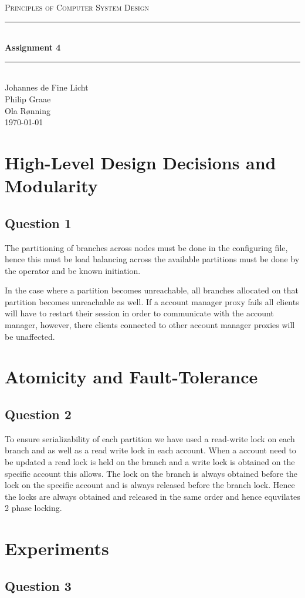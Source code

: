 \documentclass[12pt]{article}
\newcommand{\HRule}{\rule{\linewidth}{0.5mm}}
\begin{document}
\begin{center}
\textsc{\LARGE Principles of Computer System Design}\\[0.3cm] %
\HRule \\[0.4cm]
{ \huge \bfseries Assignment 4}
\HRule \\[0.4cm]
\large
Johannes de Fine Licht
\\Philip Graae
\\Ola Rønning
\\\today
\end{center}

\section*{High-Level Design Decisions and Modularity}

\subsection*{Question 1}
The partitioning of branches across nodes must be done in the configuring file, hence this must be load balancing across the available partitions must be done by the operator and be known initiation.

In the case where a partition becomes unreachable, all branches allocated on that partition becomes unreachable as well. If a account manager proxy fails all clients will have to restart their session in order to communicate with the account manager, however, there clients connected to other account manager proxies will be unaffected.
\section*{Atomicity and Fault-Tolerance}

\subsection*{Question 2}
To ensure serializability of each partition we have used a read-write lock on each branch and as well as a read write lock in each account. When a account need to be updated a read lock is held on the branch and a write lock is obtained on the specific account this allows. The lock on the branch is always obtained before the lock on the specific account and is always released  before the branch lock. Hence the locks are always obtained and released in the same order and hence equvilates 2 phase locking.
\section*{Experiments}

\subsection*{Question 3}
\end{document}

